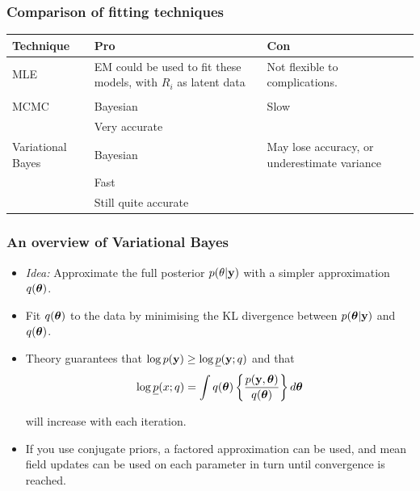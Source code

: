 \documentclass{beamer}
\begin{document}
\begin{frame}
	\frametitle{Comparison of fitting techniques}
	\begin{tabular}{p{2cm}p{3.5cm}p{4.5cm}}
		Technique         & Pro                                                             & Con                                          \\
		\hline
		MLE               & EM could be used to fit these models, with $R_i$ as latent data & Not flexible to complications.               \\
		                  &                                                                 &                                              \\ %
		\hline
		MCMC              & Bayesian                                                        & Slow                                         \\
		                  & Very accurate                                                   &                                              \\
		\hline
		Variational Bayes & Bayesian                                                        & May lose accuracy, or underestimate variance \\
		                  & Fast                                                            &                                              \\ %
		                  & Still quite accurate                                            &                                              \\
		\hline
	\end{tabular}
	
\end{frame}

\begin{frame}
	\frametitle{An overview of Variational Bayes}
	\begin{itemize}
		\item \emph{Idea:} Approximate the full posterior $p(\theta|{\bf y})$ with a simpler approximation $q({\boldsymbol \theta})$.
		      
		\item Fit $q({\boldsymbol \theta})$ to the data by minimising the KL divergence between $p({\boldsymbol \theta}|{\bf y})$ and $q({\boldsymbol \theta})$.
		      
		\item Theory guarantees that $\log p({\bf y})\ge 
		      \log \underline{p}({\bf y};q)$ and that 
		      $$
		      \log \underline{p}(x;q) = \int q({\boldsymbol \theta}) \left\{ \frac{p({\bf y},{\boldsymbol \theta})}{q({\boldsymbol \theta})} \right\} d {\boldsymbol \theta}
		      $$ 
		      
		      \noindent will
		      increase with each iteration.
		      
		\item If you use conjugate priors, a factored approximation can be used, and mean field updates can be used on
		      each parameter in turn until convergence is reached.
	\end{itemize}
\end{frame}
\end{document}

